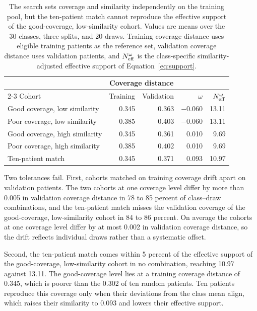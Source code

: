 \begin{table}[htbp]
\centering
\renewcommand{\arraystretch}{1.15}
\begin{tabular}{@{}lrrrr@{}}
\toprule
 & \multicolumn{2}{c}{Coverage distance} & & \\
\cmidrule(lr){2-3}
Cohort & Training & Validation & $\omega$ & $N_{\mathrm{eff}}^{\omega}$ \\
\midrule
Good coverage, low similarity & 0.345 & 0.363 & $-0.060$ & 13.11 \\
Poor coverage, low similarity & 0.385 & 0.403 & $-0.060$ & 13.11 \\
Good coverage, high similarity & 0.345 & 0.361 & 0.010 & 9.69 \\
Poor coverage, high similarity & 0.385 & 0.402 & 0.010 & 9.69 \\
\addlinespace
Ten-patient match & 0.345 & 0.371 & 0.093 & 10.97 \\
\bottomrule
\end{tabular}
\caption{The search sets coverage and similarity independently on the training pool, but the ten-patient match cannot reproduce the effective support of the good-coverage, low-similarity cohort. Values are means over the 30 classes, three splits, and 20 draws. Training coverage distance uses eligible training patients as the reference set, validation coverage distance uses validation patients, and $N_{\mathrm{eff}}^{\omega}$ is the class-specific similarity-adjusted effective support of Equation~\eqref{eq:support}.}
\label{tab:check-results}
\end{table}

\noindent Two tolerances fail. First, cohorts matched on training coverage drift apart on validation patients. The two cohorts at one coverage level differ by more than 0.005 in validation coverage distance in 78 to 85 percent of class--draw combinations, and the ten-patient match misses the validation coverage of the good-coverage, low-similarity cohort in 84 to 86 percent. On average the cohorts at one coverage level differ by at most 0.002 in validation coverage distance, so the drift reflects individual draws rather than a systematic offset.

Second, the ten-patient match comes within 5 percent of the effective support of the good-coverage, low-similarity cohort in no combination, reaching 10.97 against 13.11. The good-coverage level lies at a training coverage distance of 0.345, which is poorer than the 0.302 of ten random patients. Ten patients reproduce this coverage only when their deviations from the class mean align, which raises their similarity to 0.093 and lowers their effective support.

